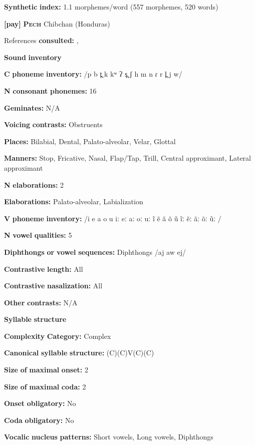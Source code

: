\textbf{Synthetic} \textbf{index:} 1.1 morphemes/word (557 morphemes, 520 words)

\textbf{[pay]}   \textbf{\textsc{Pech}}  Chibchan (Honduras)

References \textbf{consulted:} \citet{Holt1986}, \citet{Holt1999}

\textbf{Sound} \textbf{inventory}

\textbf{C} \textbf{phoneme} \textbf{inventory:} /p b t̪ k kʷ ʔ s̪ ʃ h m n ɾ r l̪ j w/

\textbf{N} \textbf{consonant} \textbf{phonemes:} 16

\textbf{Geminates:} N/A

\textbf{Voicing} \textbf{contrasts:} Obstruents

\textbf{Places:} Bilabial, Dental, Palato-alveolar, Velar, Glottal

\textbf{Manners:} Stop, Fricative, Nasal, Flap/Tap, Trill, Central approximant, Lateral approximant

\textbf{N} \textbf{elaborations:} 2

\textbf{Elaborations:} Palato-alveolar, Labialization

\textbf{V} \textbf{phoneme} \textbf{inventory:} /i e a o u iː eː aː oː uː ĩ ẽ ã õ ũ ĩː ẽː ãː õː ũː /

\textbf{N} \textbf{vowel} \textbf{qualities:} 5

\textbf{Diphthongs} \textbf{or} \textbf{vowel} \textbf{sequences:} Diphthongs /aj aw ej/

\textbf{Contrastive} \textbf{length:} All

\textbf{Contrastive} \textbf{nasalization:} All

\textbf{Other} \textbf{contrasts:} N/A

\textbf{Syllable} \textbf{structure}

\textbf{Complexity} \textbf{Category:} Complex

\textbf{Canonical} \textbf{syllable} \textbf{structure:} (C)(C)V(C)(C) \citep[20-21]{Holt1999}

\textbf{Size} \textbf{of} \textbf{maximal} \textbf{onset:} 2

\textbf{Size} \textbf{of} \textbf{maximal} \textbf{coda:} 2

\textbf{Onset} \textbf{obligatory:} No

\textbf{Coda} \textbf{obligatory:} No

\textbf{Vocalic} \textbf{nucleus} \textbf{patterns:} Short vowels, Long vowels, Diphthongs

